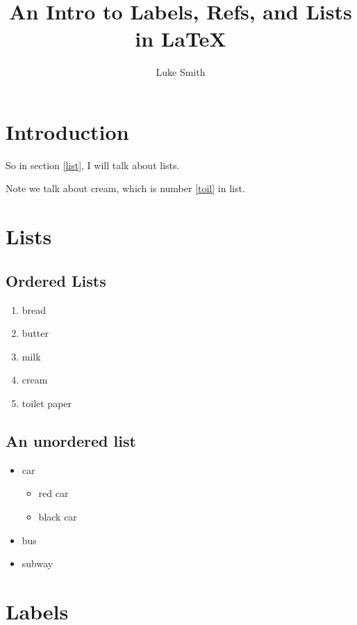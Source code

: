 \documentclass{article}
\author{Luke Smith}
\title{An Intro to Labels, Refs, and Lists in {\LaTeX}}
\begin{document}
\maketitle

\section{Introduction}
So in section \ref{list}, I will talk about lists.

Note we talk about cream, which is number \ref{toil} in list.

\section{Lists\label{list}}

\subsection{Ordered Lists}

\begin{enumerate}
	\item bread
	\item butter
	\item milk
	\item cream\label{toil}
	\item toilet paper
\end{enumerate}

\subsection{An unordered list}

\begin{itemize}
	\item car
	\begin{itemize}
		\item red car
		\item black car
	\end{itemize}
	\item bus
	\item subway
\end{itemize}


\section{Labels}
\end{document}
